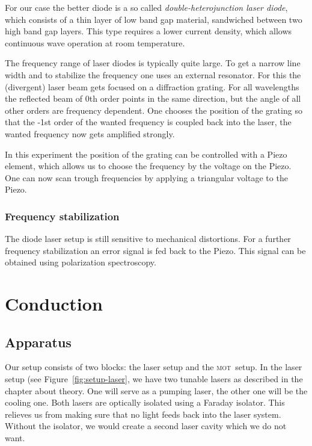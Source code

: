 \documentclass[11pt, english, fleqn, DIV=15, headinclude, BCOR=2cm]{scrreprt}
\newcommand\mot{\textsc{mot}}
\begin{document}
For our case the better diode is a so called \emph{double-heterojunction laser
diode}, which consists of a thin layer of low band gap material, sandwiched
between two high band gap layers. This type requires a lower current
density, which allows continuous wave operation at room temperature. 

The frequency range of laser diodes is typically quite large. To get a narrow
line width and to stabilize the frequency one uses an external resonator. For
this the (divergent) laser beam gets focused on a diffraction grating. For all
wavelengths the reflected beam of 0th order points in the same direction, but
the angle of all other orders are frequency dependent. One chooses the position
of the grating so that the -1st order of the wanted frequency is coupled back
into the laser, the wanted frequency now gets amplified strongly. 

In this experiment the position of the grating can be controlled with a Piezo
element, which allows us to choose the frequency by the voltage on the Piezo.
One can now scan trough frequencies by applying a triangular voltage to the
Piezo.

\subsection{Frequency stabilization}

The diode laser setup is still sensitive to mechanical distortions. For a
further frequency stabilization an error signal is fed back to the Piezo. This
signal can be obtained using polarization spectroscopy.

\chapter{Conduction}

\section{Apparatus}

Our setup consists of two blocks: the laser setup and the \mot\ setup. In the
laser setup (see Figure~\ref{fig:setup-laser}, we have two tunable lasers as
described in the chapter about theory. One will serve as a pumping laser, the
other one will be the cooling one. Both lasers are optically isolated using a
Faraday isolator. This relieves us from making sure that no light feeds back
into the laser system. Without the isolator, we would create a second laser
cavity which we do not want.
\end{document}
